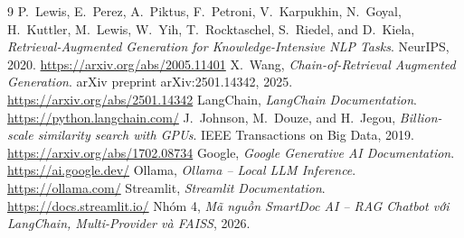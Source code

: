 \documentclass[10pt, conference, a4paper, compsocconf]{IEEEtran}
\begin{document}
\begin{thebibliography}{9}
 P.~Lewis, E.~Perez, A.~Piktus, F.~Petroni, V.~Karpukhin, N.~Goyal, H.~Kuttler, M.~Lewis, W.~Yih, T.~Rocktaschel, S.~Riedel, and D.~Kiela, \emph{Retrieval-Augmented Generation for Knowledge-Intensive NLP Tasks}. NeurIPS, 2020. \url{https://arxiv.org/abs/2005.11401}
 X.~Wang, \emph{Chain-of-Retrieval Augmented Generation}. arXiv preprint arXiv:2501.14342, 2025. \url{https://arxiv.org/abs/2501.14342}
 LangChain, \emph{LangChain Documentation}. \url{https://python.langchain.com/}
 J.~Johnson, M.~Douze, and H.~Jegou, \emph{Billion-scale similarity search with GPUs}. IEEE Transactions on Big Data, 2019. \url{https://arxiv.org/abs/1702.08734}
 Google, \emph{Google Generative AI Documentation}. \url{https://ai.google.dev/}
 Ollama, \emph{Ollama -- Local LLM Inference}. \url{https://ollama.com/}
 Streamlit, \emph{Streamlit Documentation}. \url{https://docs.streamlit.io/}
 Nhóm 4, \emph{Mã nguồn SmartDoc AI -- RAG Chatbot với LangChain, Multi-Provider và FAISS}, 2026.
\end{thebibliography}
\end{document}
